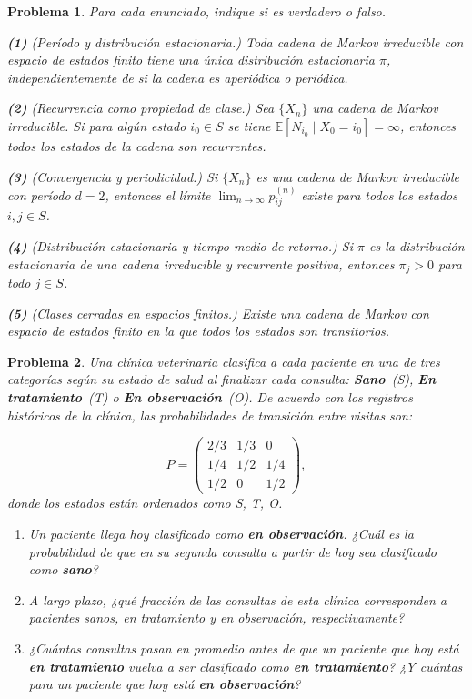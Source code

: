 \documentclass[12pt]{article}
\newtheorem{problem}{Problema}
\begin{document}
\begin{problem} Para cada enunciado, indique si es verdadero o falso.

\noindent\textbf{(1)} \emph{(Período y distribución estacionaria.)} Toda cadena de Markov irreducible con espacio de estados finito tiene una única distribución estacionaria $\pi$, independientemente de si la cadena es aperiódica o periódica.

\noindent\textbf{(2)} \emph{(Recurrencia como propiedad de clase.)} Sea $\{X_n\}$ una cadena de Markov irreducible. Si para algún estado $i_0 \in S$ se tiene $\mathbb{E}[N_{i_0} \mid X_0 = i_0] = \infty$, entonces todos los estados de la cadena son recurrentes.

\noindent\textbf{(3)} \emph{(Convergencia y periodicidad.)} Si $\{X_n\}$ es una cadena de Markov irreducible con período $d = 2$, entonces el límite $\lim_{n \to \infty} p_{ij}^{(n)}$ existe para todos los estados $i, j \in S$.

\noindent\textbf{(4)} \emph{(Distribución estacionaria y tiempo medio de retorno.)} Si $\pi$ es la distribución estacionaria de una cadena irreducible y recurrente positiva, entonces $\pi_j > 0$ para todo $j \in S$.

\noindent\textbf{(5)} \emph{(Clases cerradas en espacios finitos.)} Existe una cadena de Markov con espacio de estados finito en la que todos los estados son transitorios.



\end{problem}

\begin{problem}
Una clínica veterinaria clasifica a cada paciente en una de tres categorías según su estado de salud al finalizar cada consulta: \textbf{Sano}~(S), \textbf{En tratamiento}~(T) o \textbf{En observación}~(O). De acuerdo con los registros históricos de la clínica, las probabilidades de transición entre visitas son:

\[
P = \begin{pmatrix}
    2/3 & 1/3 & 0   \\[4pt]
    1/4 & 1/2 & 1/4 \\[4pt]
    1/2 & 0   & 1/2
\end{pmatrix},
\]
donde los estados están ordenados como S, T, O.

\begin{enumerate}
    \item[(a)] Un paciente llega hoy clasificado como \textbf{en observación}. ¿Cuál es la probabilidad de que en su segunda consulta a partir de hoy sea clasificado como \textbf{sano}?

    \item[(b)] A largo plazo, ¿qué fracción de las consultas de esta clínica corresponden a pacientes sanos, en tratamiento y en observación, respectivamente?

    \item[(c)] ¿Cuántas consultas pasan en promedio antes de que un paciente que hoy está \textbf{en tratamiento} vuelva a ser clasificado como \textbf{en tratamiento}? ¿Y cuántas para un paciente que hoy está \textbf{en observación}?
\end{enumerate}
\end{problem}
\end{document}
